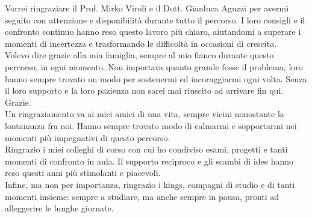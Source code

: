\documentclass[12pt,a4paper,openright,oneside]{book}
\begin{document}
%
%
\backmatter
%


%
\begin{acknowledgements} %
    Vorrei ringraziare il Prof. Mirko Viroli e il Dott. Gianluca Aguzzi per avermi seguito con attenzione e disponibilità durante tutto il percorso. I loro consigli e il confronto continuo hanno reso questo lavoro più chiaro, aiutandomi a superare i momenti di incertezza e trasformando le difficoltà in occasioni di crescita.
\\
Volevo dire grazie alla mia famiglia, sempre al mio fianco durante questo percorso, in ogni momento. Non importava quanto grande fosse il problema, loro hanno sempre trovato un modo per sostenermi ed incoraggiarmi ogni volta. Senza il loro supporto e la loro pazienza non sarei mai riuscito ad arrivare fin qui. Grazie.
\\
Un ringraziamento va ai miei amici di una vita, sempre vicini nonostante la lontananza fra noi. Hanno sempre trovato modo di calmarmi e sopportarmi nei momenti più impegnativi di questo percorso.
\\
Ringrazio i miei colleghi di corso con cui ho condiviso esami, progetti e tanti momenti di confronto in aula. Il supporto reciproco e gli scambi di idee hanno reso questi anni più stimolanti e piacevoli.
\\
Infine, ma non per importanza, ringrazio i kings, compagni di studio e di tanti momenti insieme: sempre a studiare, ma anche sempre in pausa, pronti ad alleggerire le lunghe giornate.
\end{acknowledgements}
%
\end{document}
